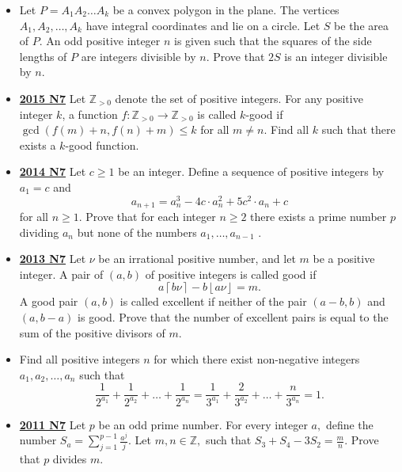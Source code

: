 \documentclass[11pt]{scrartcl}
\begin{document}
\begin{itemize}[leftmargin=*]
\item {}  Let $P=A_1A_2\dots A_k$ be a convex polygon in the plane. The vertices $A_1, A_2, \dots, A_k$ have integral coordinates and lie on a circle. Let $S$ be the area of $P$. An odd positive integer $n$ is given such that the squares of the side lengths of $P$ are integers divisible by $n$. Prove that $2S$ is an integer divisible by $n$.
\item  \href{https://artofproblemsolving.com/community/c6h1268919p6622862}{\textbf{2015 N7}} Let $\mathbb{Z}_{>0}$ denote the set of positive integers. For any positive integer $k$, a function $f: \mathbb{Z}_{>0} \to \mathbb{Z}_{>0}$ is called $k$-good if $\gcd(f(m) + n, f(n) + m) \leqslant k$ for all $m \neq n$. Find all $k$ such that there exists a $k$-good function.
\item  \href{https://artofproblemsolving.com/community/c6h1113202p5083576}{\textbf{2014 N7}} Let $c \geqslant  1$ be an integer. Define a sequence of positive integers by $a_1 = c$ and\[a_{n+1}=a_n^3-4c\cdot a_n^2+5c^2\cdot a_n+c\]for all $n\geqslant  1$. Prove that for each integer $n \geqslant  2$ there exists a prime number $p$ dividing $a_n$ but none of the numbers $a_1 , \dots , a_{n -1}$ .
\item  \href{https://artofproblemsolving.com/community/c6h597250p3544112}{\textbf{2013 N7}} Let $\nu$ be an irrational positive number, and let $m$ be a positive integer. A pair of $(a,b)$ of positive integers is called good if
\[a \left \lceil b\nu \right \rceil - b \left \lfloor a \nu \right \rfloor = m.\]A good pair $(a,b)$ is called excellent if neither of the pair $(a-b,b)$ and $(a,b-a)$ is good. Prove that the number of excellent pairs is equal to the sum of the positive divisors of $m$.
\item  {} Find all positive integers $n$ for which there exist non-negative integers $a_1, a_2, \dots, a_n$ such that
\[
\frac{1}{2^{a_1}} + \frac{1}{2^{a_2}} + \dots + \frac{1}{2^{a_n}} = 
\frac{1}{3^{a_1}} + \frac{2}{3^{a_2}} + \dots + \frac{n}{3^{a_n}} = 1.
\]
\item  \href{https://artofproblemsolving.com/community/c6h488544p2737656}{\textbf{2011 N7}} Let $p$ be an odd prime number. For every integer $a,$ define the number $S_a = \sum^{p-1}_{j=1} \frac{a^j}{j}.$ Let $m,n \in \mathbb{Z},$ such that $S_3 + S_4 - 3S_2 = \frac{m}{n}.$ Prove that $p$ divides $m.$

\end{itemize}
\end{document}
